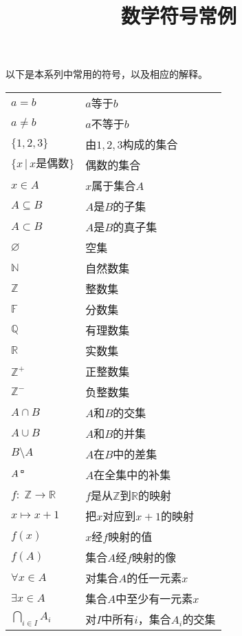 \documentclass[12pt,UTF8]{article}
\title{\zihao{0} \bfseries 数学符号常例}
\date{}
\begin{document}
\maketitle

以下是本系列中常用的符号，以及相应的解释。

\vspace{18pt}

\setlength{\extrarowheight}{3pt}
\begin{longtable}{ m{15em} m{15em} }
    $a = b$ & $a$等于$b$ \\
    $a \neq b$ & $a$不等于$b$ \\
    $\{1,2,3\}$ & 由$1,2,3$构成的集合 \\ 
    $\{x \, | \, x\mbox{是偶数}\}$ & 偶数的集合 \\  
    $x\in A$ & $x$属于集合$A$ \\
    $A \subseteq B$ & $A$是$B$的子集 \\
    $A \subset B$ & $A$是$B$的真子集 \\
    $\varnothing$ & 空集 \\
    $\mathbb{N}$ & 自然数集 \\
    $\mathbb{Z}$ & 整数集 \\
    $\mathbb{F}$ & 分数集 \\
    $\mathbb{Q}$ & 有理数集 \\
    $\mathbb{R}$ & 实数集 \\
    $\mathbb{Z}^+$ & 正整数集 \\
    $\mathbb{Z}^-$ & 负整数集 \\
    $A\cap B$ & $A$和$B$的交集 \\
    $A\cup B$ & $A$和$B$的并集 \\
    $B\setminus A$ & $A$在$B$中的差集 \\
    $A^{\bu}$ & $A$在全集中的补集 \\
    $f:\; \mathbb{Z} \rightarrow \mathbb{R}$ & $f$是从$\mathbb{Z}$到$\mathbb{R}$的映射 \\
    $x\mapsto x+1$ & 把$x$对应到$x+1$的映射 \\
    $f(x)$ & $x$经$f$映射的值 \\
    $f(A)$ & 集合$A$经$f$映射的像 \\
    $\forall x \in A$ & 对集合$A$的任一元素$x$ \\
    $\exists x \in A$ & 集合$A$中至少有一元素$x$ \\
    $\displaystyle\bigcap_{i\in I} A_i$ & 对$I$中所有$i$，集合$A_i$的交集 \\

\end{longtable}
\end{document}
